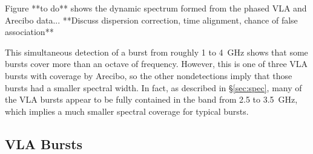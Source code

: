 \documentclass[twocolumn]{aastex61}
\begin{document}
Figure {\color{red} **to do**} shows the dynamic spectrum formed from the phased VLA and Arecibo data... **Discuss dispersion correction, time alignment, chance of false association** 

This simultaneous detection of a burst from roughly 1 to 4~GHz shows that some bursts cover more than an octave of frequency. However, this is one of three VLA bursts with coverage by Arecibo, so the other nondetections imply that those bursts had a smaller spectral width. In fact, as described in \S \ref{sec:spec}, many of the VLA bursts appear to be fully contained in the band from 2.5 to 3.5~GHz, which implies a much smaller spectral coverage for typical bursts.


\subsection{VLA Bursts}
\end{document}
